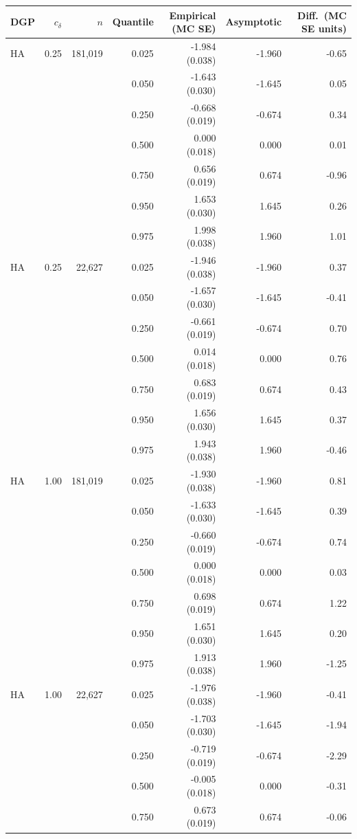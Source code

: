 \begin{tabular}{lrrrrrr}
\toprule
DGP & $c_\delta$ & $n$ & Quantile & Empirical (MC SE) & Asymptotic & Diff.\ (MC SE units) \\
\midrule
HA & 0.25 & 181,019 & 0.025 & -1.984 (0.038) & -1.960 & -0.65 \\
 &  &  & 0.050 & -1.643 (0.030) & -1.645 & 0.05 \\
 &  &  & 0.250 & -0.668 (0.019) & -0.674 & 0.34 \\
 &  &  & 0.500 & 0.000 (0.018) & 0.000 & 0.01 \\
 &  &  & 0.750 & 0.656 (0.019) & 0.674 & -0.96 \\
 &  &  & 0.950 & 1.653 (0.030) & 1.645 & 0.26 \\
 &  &  & 0.975 & 1.998 (0.038) & 1.960 & 1.01 \\
\addlinespace
HA & 0.25 & 22,627 & 0.025 & -1.946 (0.038) & -1.960 & 0.37 \\
 &  &  & 0.050 & -1.657 (0.030) & -1.645 & -0.41 \\
 &  &  & 0.250 & -0.661 (0.019) & -0.674 & 0.70 \\
 &  &  & 0.500 & 0.014 (0.018) & 0.000 & 0.76 \\
 &  &  & 0.750 & 0.683 (0.019) & 0.674 & 0.43 \\
 &  &  & 0.950 & 1.656 (0.030) & 1.645 & 0.37 \\
 &  &  & 0.975 & 1.943 (0.038) & 1.960 & -0.46 \\
\addlinespace
HA & 1.00 & 181,019 & 0.025 & -1.930 (0.038) & -1.960 & 0.81 \\
 &  &  & 0.050 & -1.633 (0.030) & -1.645 & 0.39 \\
 &  &  & 0.250 & -0.660 (0.019) & -0.674 & 0.74 \\
 &  &  & 0.500 & 0.000 (0.018) & 0.000 & 0.03 \\
 &  &  & 0.750 & 0.698 (0.019) & 0.674 & 1.22 \\
 &  &  & 0.950 & 1.651 (0.030) & 1.645 & 0.20 \\
 &  &  & 0.975 & 1.913 (0.038) & 1.960 & -1.25 \\
\addlinespace
HA & 1.00 & 22,627 & 0.025 & -1.976 (0.038) & -1.960 & -0.41 \\
 &  &  & 0.050 & -1.703 (0.030) & -1.645 & -1.94 \\
 &  &  & 0.250 & -0.719 (0.019) & -0.674 & -2.29 \\
 &  &  & 0.500 & -0.005 (0.018) & 0.000 & -0.31 \\
 &  &  & 0.750 & 0.673 (0.019) & 0.674 & -0.06 \\

\end{tabular}
